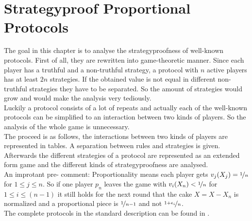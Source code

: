 \section{Strategyproof Proportional Protocols}
The goal in this chapter is to analyse the strategyproofness of well-known protocols. First of all, they are rewritten into game-theoretic manner. Since each player has a truthful and a non-truthful strategy, a protocol with $n$ active players has at least $2n$ strategies. If the obtained value is not equal in different non-truthful strategies they have to be separated. So the amount of strategies would grow and would make the analysis very tediously.\\Luckily a protocol consists of a lot of repeats and actually each of the well-known protocols can be simplified to an interaction between two kinds of players. So the analysis of the whole game is unnecessary.\\
The proceed is as follows, the interactions between two kinds of players are represented in tables. A separation between rules and strategies is given. Afterwards the different strategies of a protocol are represented as an extended form game and the different kinds of strategyproofness are analysed.\\
An improtant pre- comment: Proportionality means each player gets $v_j(X_j)=\nicefrac{1}{n}$ for $1\leq j\leq n$. So if one player $p_n$ leaves the game with $v_i(X_n)<\nicefrac{1}{n}$ for $1\leq i\leq (n-1)$ it still holds for the next round that the cake $X=X-X_n$ is normalized and a proportional piece is $\nicefrac{1}{n-1}$ and not $\nicefrac{1+\epsilon_i}{n}$.
\\The complete protocols in the standard description can be found in \cite{robertson:cake-cutting}.

